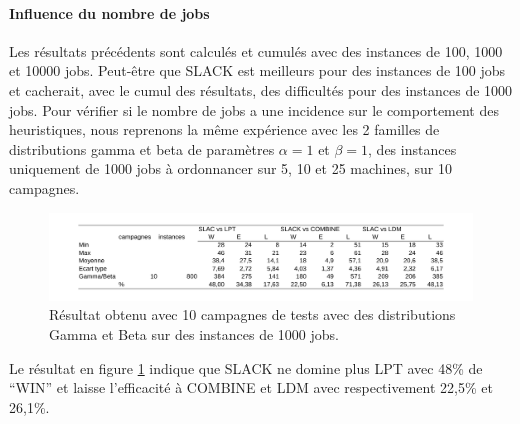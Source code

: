 \documentclass[a4paper,12pt]{report}
\theoremstyle{plain}				%
\theoremstyle{definition}				%
\newcommand{\lp}[1]{\todo[author=LP,color=yellow,inline]{#1}}
\begin{document}
\paragraph{Influence du nombre de jobs}
Les résultats précédents sont calculés et cumulés avec des instances de 100, 1000 et 10000 jobs. 
Peut-être que SLACK est meilleurs pour des instances de 100 jobs et cacherait, avec le cumul des résultats, 
  des difficultés pour des instances de 1000 jobs. 
Pour vérifier si le nombre de jobs a une incidence sur le comportement des heuristiques, 
  nous reprenons la même expérience avec 
  les 2 familles de distributions gamma et beta de paramètres $\alpha = 1$ et $\beta = 1$,
  des instances uniquement de 1000 jobs à ordonnancer sur 5, 10 et 25 machines,
  sur 10 campagnes.
\begin{figure}
{\centering
\includegraphics[width=\columnwidth]{6_Resultat_Reproduction10GammaBeta1000.pdf}
\caption{Résultat obtenu avec 10 campagnes de tests avec des distributions Gamma et Beta sur des instances de 1000 jobs.}
\label{fig:resultatReproduction10GammaBeta1000}
\par}
\end{figure}

Le résultat en figure \ref{fig:resultatReproduction10GammaBeta1000} indique que 
  SLACK ne domine plus LPT avec 48\% de ``WIN'' et
  laisse l'efficacité à COMBINE et LDM avec respectivement 22,5\% et 26,1\%.



\bigskip
\end{document}
